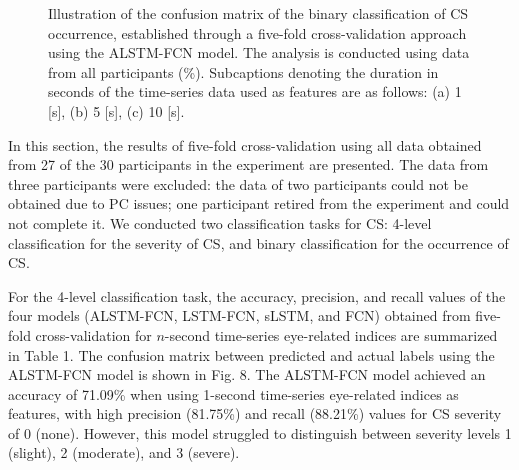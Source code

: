 \documentclass{ieeeaccess}
\begin{document}
\begin{figure}[htbp!]
    \centering
    \hfill
    \hfill
    \caption{Illustration of the confusion matrix of the binary classification of CS occurrence, established through a five-fold cross-validation approach using the ALSTM-FCN model. The analysis is conducted using data from all participants (\%). Subcaptions denoting the duration in seconds of the time-series data used as features are as follows: (a) 1 [s], (b) 5 [s], (c) 10 [s].}
    \label{fig:2class}
\end{figure}

In this section, the results of five-fold cross-validation using all data obtained from 27 of the 30 participants in the experiment are presented. The data from three participants were excluded: the data of two participants could not be obtained due to PC issues; one participant retired from the experiment and could not complete it. We conducted two classification tasks for CS: 4-level classification for the severity of CS, and binary classification for the occurrence of CS. 

For the 4-level classification task, the accuracy, precision, and recall values of the four models (ALSTM-FCN, LSTM-FCN, sLSTM, and FCN) obtained from five-fold cross-validation for $n$-second time-series eye-related indices are summarized in Table 1. The confusion matrix between predicted and actual labels using the ALSTM-FCN model is shown in Fig. 8. The ALSTM-FCN model achieved an accuracy of 71.09\% when using 1-second time-series eye-related indices as features, with high precision (81.75\%) and recall (88.21\%) values for CS severity of 0 (none). However, this model struggled to distinguish between severity levels 1 (slight), 2 (moderate), and 3 (severe).
\end{document}
